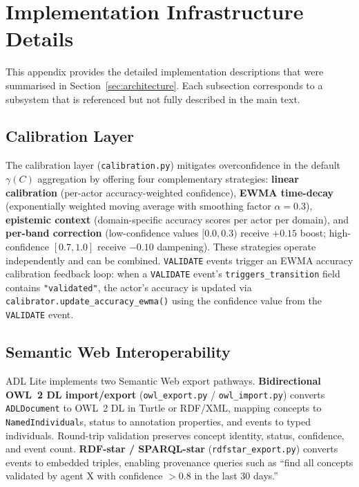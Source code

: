 
\section{Implementation Infrastructure Details}\label{app:implementation}

This appendix provides the detailed implementation descriptions that were summarised in Section~\ref{sec:architecture}. Each subsection corresponds to a subsystem that is referenced but not fully described in the main text.

\subsection{Calibration Layer}\label{app:calibration}

The calibration layer (\texttt{calibration.py}) mitigates overconfidence in the default $\gamma(C)$ aggregation by offering four complementary strategies: \textbf{linear calibration} (per-actor accuracy-weighted confidence), \textbf{EWMA time-decay} (exponentially weighted moving average with smoothing factor $\alpha = 0.3$), \textbf{epistemic context} (domain-specific accuracy scores per actor per domain), and \textbf{per-band correction} (low-confidence values $[0.0, 0.3)$ receive $+0.15$ boost; high-confidence $[0.7, 1.0]$ receive $-0.10$ dampening). These strategies operate independently and can be combined. \texttt{VALIDATE} events trigger an EWMA accuracy calibration feedback loop: when a \texttt{VALIDATE} event's \texttt{triggers\_transition} field contains \texttt{"validated"}, the actor's accuracy is updated via \texttt{calibrator.update\_accuracy\_ewma()} using the confidence value from the \texttt{VALIDATE} event.

\subsection{Semantic Web Interoperability}\label{app:semantic-web}

ADL Lite implements two Semantic Web export pathways. \textbf{Bidirectional OWL~2 DL import/export} (\texttt{owl\_export.py} / \texttt{owl\_import.py}) converts \texttt{ADLDocument} to OWL~2 DL in Turtle or RDF/XML, mapping concepts to \texttt{NamedIndividual}s, status to annotation properties, and events to typed individuals. Round-trip validation preserves concept identity, status, confidence, and event count. \textbf{RDF-star / SPARQL-star} (\texttt{rdfstar\_export.py}) converts events to embedded triples, enabling provenance queries such as ``find all concepts validated by agent X with confidence $>0.8$ in the last 30 days.''


